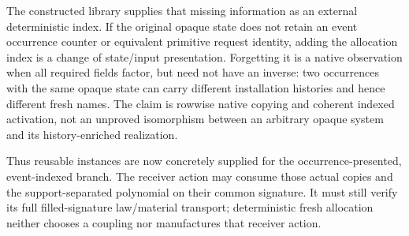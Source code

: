 \documentclass[11pt]{article}
\begin{document}
The constructed library supplies that missing information as an external deterministic index. If the original opaque state does not retain an event occurrence counter or equivalent primitive request identity, adding the allocation index is a change of state/input presentation. Forgetting it is a native observation when all required fields factor, but need not have an inverse: two occurrences with the same opaque state can carry different installation histories and hence different fresh names. The claim is rowwise native copying and coherent indexed activation, not an unproved isomorphism between an arbitrary opaque system and its history-enriched realization.

Thus reusable instances are now concretely supplied for the occurrence-presented, event-indexed branch. The receiver action may consume those actual copies and the support-separated polynomial on their common signature. It must still verify its full filled-signature law/material transport; deterministic fresh allocation neither chooses a coupling nor manufactures that receiver action.
\end{document}
